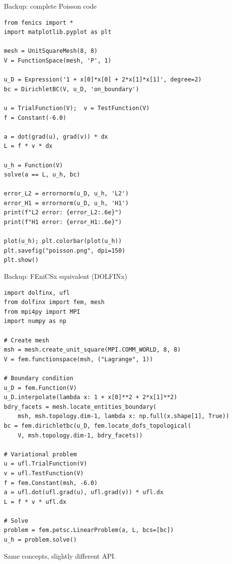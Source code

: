 \documentclass[aspectratio=169, 11pt]{beamer}
\begin{document}
\begin{frame}[fragile]{Backup: complete Poisson code}

\begin{lstlisting}[basicstyle=\ttfamily\tiny]
from fenics import *
import matplotlib.pyplot as plt

mesh = UnitSquareMesh(8, 8)
V = FunctionSpace(mesh, 'P', 1)

u_D = Expression('1 + x[0]*x[0] + 2*x[1]*x[1]', degree=2)
bc = DirichletBC(V, u_D, 'on_boundary')

u = TrialFunction(V);  v = TestFunction(V)
f = Constant(-6.0)

a = dot(grad(u), grad(v)) * dx
L = f * v * dx

u_h = Function(V)
solve(a == L, u_h, bc)

error_L2 = errornorm(u_D, u_h, 'L2')
error_H1 = errornorm(u_D, u_h, 'H1')
print(f"L2 error: {error_L2:.6e}")
print(f"H1 error: {error_H1:.6e}")

plot(u_h); plt.colorbar(plot(u_h))
plt.savefig("poisson.png", dpi=150)
plt.show()
\end{lstlisting}

\end{frame}

\begin{frame}[fragile,shrink=4]{Backup: FEniCSx equivalent (DOLFINx)}

\begin{lstlisting}[basicstyle=\ttfamily\tiny]
import dolfinx, ufl
from dolfinx import fem, mesh
from mpi4py import MPI
import numpy as np

# Create mesh
msh = mesh.create_unit_square(MPI.COMM_WORLD, 8, 8)
V = fem.functionspace(msh, ("Lagrange", 1))

# Boundary condition
u_D = fem.Function(V)
u_D.interpolate(lambda x: 1 + x[0]**2 + 2*x[1]**2)
bdry_facets = mesh.locate_entities_boundary(
    msh, msh.topology.dim-1, lambda x: np.full(x.shape[1], True))
bc = fem.dirichletbc(u_D, fem.locate_dofs_topological(
    V, msh.topology.dim-1, bdry_facets))

# Variational problem
u = ufl.TrialFunction(V)
v = ufl.TestFunction(V)
f = fem.Constant(msh, -6.0)
a = ufl.dot(ufl.grad(u), ufl.grad(v)) * ufl.dx
L = f * v * ufl.dx

# Solve
problem = fem.petsc.LinearProblem(a, L, bcs=[bc])
u_h = problem.solve()
\end{lstlisting}

\small
Same concepts, slightly different API.

\end{frame}
\end{document}
